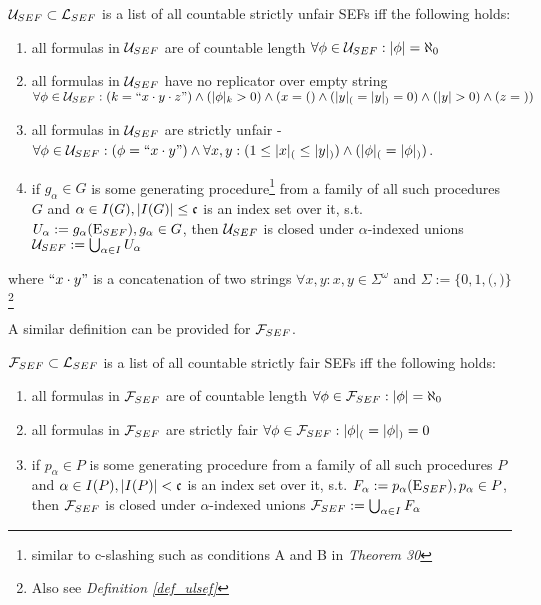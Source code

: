 \begin{definition}\label{def_all_strictly_unfair}
  $\mathcal{U}_{SEF} \subset \mathcal{L}_{SEF}$ is a list of all countable strictly unfair SEFs iff the following holds:
  \begin{enumerate}
    \item all formulas in $\mathcal{U}_{SEF}$ are of countable length $\forall \phi \in \mathcal{U}_{SEF}: |\phi| = \aleph_0$
    \item all formulas in $\mathcal{U}_{SEF}$ have no replicator over empty string $\forall \phi \in \mathcal{U}_{SEF}: (k = \text{``} x \cdot y \cdot z\text{''}) \land (|\phi|_{k} > 0) \land (x = {(}) \land (|y|_{(} = |y|_{)} = 0) \land (|y| > 0) \land (z = {)})$
    \item all formulas in $\mathcal{U}_{SEF}$ are strictly unfair - $\forall \phi \in \mathcal{U}_{SEF}: ( \phi = \text{``} x \cdot y\text{''}) \land \forall x,y: (1 \leq |x|_{(} \leq |y|_{)}) \land (|\phi|_{(} = |\phi|_{)})$.
    \item if $g_\alpha \in G$ is some generating procedure\footnote{similar to c-slashing such as conditions A and B in \textit{Theorem 30}} from a family of all such procedures $G$ and $\alpha \in I(G), |I(G)| \leq \mathfrak{c}$ is an index set over it, s.t. $U_\alpha := g_\alpha(\mathrm{E}_{SEF}), g_\alpha \in G$, then $\mathcal{U}_{SEF}$ is closed under $\alpha$-indexed unions $\mathcal{U}_{SEF} := \bigcup_{\alpha \in I} U_\alpha$
  \end{enumerate}
  where $\text{``} x \cdot y\text{''}$ is a concatenation of two strings $\forall x,y: x,y \in \Sigma^\omega$ and $\Sigma := \{0,1,{(},{)}\}$\footnote{Also see \textit{Definition \ref{def_ulsef}}}
\end{definition}

A similar definition can be provided for $\mathcal{F}_{SEF}$.

\begin{definition}\label{def_all_strictly_fair}
  $\mathcal{F}_{SEF} \subset \mathcal{L}_{SEF}$ is a list of all countable strictly fair SEFs iff the following holds:
  \begin{enumerate}
    \item all formulas in $\mathcal{F}_{SEF}$ are of countable length $\forall \phi \in \mathcal{F}_{SEF}: |\phi| = \aleph_0$
    \item all formulas in $\mathcal{F}_{SEF}$ are strictly fair $\forall \phi \in \mathcal{F}_{SEF}: |\phi|_{(} = |\phi|_{)} = 0$
    \item if $p_\alpha \in P$ is some generating procedure from a family of all such procedures $P$ and $\alpha \in I(P), |I(P)| < \mathfrak{c}$ is an index set over it, s.t. $F_\alpha := p_\alpha(\mathrm{E}_{SEF}), p_\alpha \in P$, then $\mathcal{F}_{SEF}$ is closed under $\alpha$-indexed unions $\mathcal{F}_{SEF} := \bigcup_{\alpha \in I} F_\alpha$
  \end{enumerate}
\end{definition}

